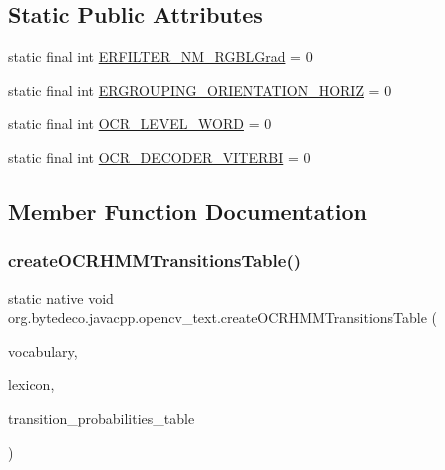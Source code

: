 \subsection*{Static Public Attributes}
\begin{DoxyCompactItemize}
\item 
static final int \hyperlink{group__text__detect_gad0d3e0c8791f14093e736cd2da75632d}{E\+R\+F\+I\+L\+T\+E\+R\+\_\+\+N\+M\+\_\+\+R\+G\+B\+L\+Grad} = 0
\item 
static final int \hyperlink{group__text__detect_gab646588b9db6ae1e1aae89cc09ea4059}{E\+R\+G\+R\+O\+U\+P\+I\+N\+G\+\_\+\+O\+R\+I\+E\+N\+T\+A\+T\+I\+O\+N\+\_\+\+H\+O\+R\+IZ} = 0
\item 
static final int \hyperlink{group__text__recognize_gac4148e33328b79dbead3c33dac186540}{O\+C\+R\+\_\+\+L\+E\+V\+E\+L\+\_\+\+W\+O\+RD} = 0
\item 
static final int \hyperlink{group__text__recognize_gac1843f0d2e0e7136debaa46d45446b11}{O\+C\+R\+\_\+\+D\+E\+C\+O\+D\+E\+R\+\_\+\+V\+I\+T\+E\+R\+BI} = 0
\end{DoxyCompactItemize}


\subsection{Member Function Documentation}
\mbox{\label{classorg_1_1bytedeco_1_1javacpp_1_1opencv__text_ac23647f4572aeec4389d900bf01bf013}} 
\subsubsection{\texorpdfstring{create\+O\+C\+R\+H\+M\+M\+Transitions\+Table()}{createOCRHMMTransitionsTable()}}
{\footnotesize\ttfamily static native void org.\+bytedeco.\+javacpp.\+opencv\+\_\+text.\+create\+O\+C\+R\+H\+M\+M\+Transitions\+Table (\begin{DoxyParamCaption}\item[{@Std\+String Byte\+Pointer}]{vocabulary,  }\item[{@By\+Ref Std\+String\+Vector}]{lexicon,  }\item[{@By\+Val Mat}]{transition\+\_\+probabilities\+\_\+table }\end{DoxyParamCaption})\hspace{0.3cm}{\ttfamily [static]}}



